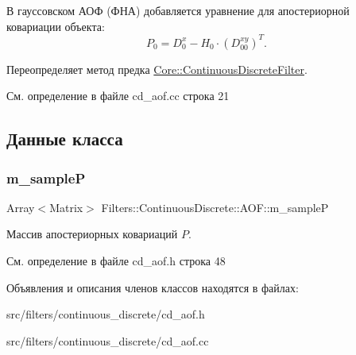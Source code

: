 В гауссовском АОФ (ФНА) добавляется уравнение для апостериорной ковариации объекта\+: \[P_0 = D_0^x - H_0 \cdot (D_{00}^{xy})^T.\] 

Переопределяет метод предка \hyperlink{class_core_1_1_continuous_discrete_filter_acc9b18241a13d46dc92ef1f02ec13e53}{Core\+::\+Continuous\+Discrete\+Filter}.



См. определение в файле cd\+\_\+aof.\+cc строка 21



\subsection{Данные класса}
\hypertarget{class_filters_1_1_continuous_discrete_1_1_a_o_f_a31111852e94dab62675d8692a4c22df1}{}\label{class_filters_1_1_continuous_discrete_1_1_a_o_f_a31111852e94dab62675d8692a4c22df1} 
\subsubsection{\texorpdfstring{m\+\_\+sampleP}{m\_sampleP}}
{\footnotesize\ttfamily Array$<$Matrix$>$ Filters\+::\+Continuous\+Discrete\+::\+A\+O\+F\+::m\+\_\+sampleP\hspace{0.3cm}{\ttfamily [protected]}}

Массив апостериорных ковариаций $P$. 

См. определение в файле cd\+\_\+aof.\+h строка 48



Объявления и описания членов классов находятся в файлах\+:\begin{DoxyCompactItemize}
\item 
src/filters/continuous\+\_\+discrete/cd\+\_\+aof.\+h\item 
src/filters/continuous\+\_\+discrete/cd\+\_\+aof.\+cc\end{DoxyCompactItemize}
